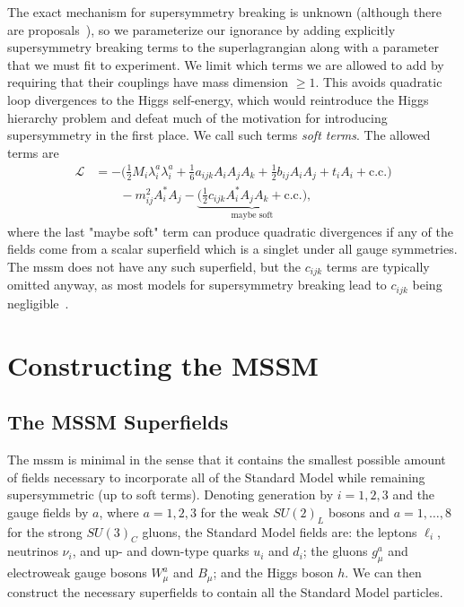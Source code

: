 The exact mechanism for supersymmetry breaking is unknown (although there are proposals~\cite{Hall:1983iz,Giudice:1998bp,Randall:1998uk}), so we parameterize our ignorance by adding explicitly supersymmetry breaking terms to the superlagrangian along with a parameter that we must fit to experiment.
We limit which terms we are allowed to add by requiring that their couplings have mass dimension $\geq 1$. This avoids quadratic loop divergences to the Higgs self-energy, which would reintroduce the Higgs hierarchy problem and defeat much of the motivation for introducing supersymmetry in the first place. We call such terms \emph{soft terms}. The allowed terms are~\cite{Martin:1997ns}
\begin{equation}
\begin{split}
    \mathcal{L} &= -\biggl(
        \frac{1}{2}M_i\lambda_i^a\lambda_i^a + \frac{1}{6} a_{ijk} A_iA_jA_k + \frac{1}{2} b_{ij} A_iA_j + t_i A_i
        + \text{c.c.}
    \biggr)
    \\ &\qquad
    - m_{ij}^2 A_i^* A_j
    - \underbrace{\biggl(\frac{1}{2}c_{ijk} A_i^*A_jA_k + \text{c.c.} \biggr)}_{\text{maybe soft}},
\end{split}
\end{equation}
where the last "maybe soft" term can produce quadratic divergences if any of the fields come from a scalar superfield which is a singlet under all gauge symmetries.
The \gls{mssm} does not have any such superfield, but the $c_{ijk}$ terms are typically omitted anyway, as most models for supersymmetry breaking lead to $c_{ijk}$ being negligible~\cite{Martin:1997ns}.




\section{Constructing the MSSM}

\subsection{The MSSM Superfields}

The \gls{mssm} is minimal in the sense that it contains the smallest possible amount of fields necessary to incorporate all of the Standard Model while remaining supersymmetric (up to soft terms). Denoting generation by $i=1,2,3$ and the gauge fields by $a$, where $a=1,2,3$ for the weak $SU(2)_L$ bosons and $a=1,\ldots,8$ for the strong $SU(3)_C$ gluons, the Standard Model fields are: the leptons $\ell_i$, neutrinos $\nu_i$, and up- and down-type quarks $u_i$ and $d_i$; the gluons $g^a_\mu$ and electroweak gauge bosons $W^a_\mu$ and $B_\mu$; and the Higgs boson $h$.
We can then construct the necessary superfields to contain all the Standard Model particles.

